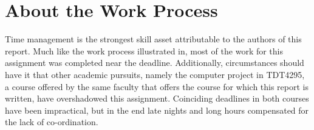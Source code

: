 \section{About the Work Process}

Time management is the strongest skill asset attributable to the authors of this report.
Much like the work process illustrated in\cite{assignment-1}, most of the work for this assignment was completed near the deadline.
Additionally, circumstances should have it that other academic pursuits, namely the computer project in TDT4295, a course offered by the same faculty that offers the course for which this report is written, have overshadowed this assignment.
Coinciding deadlines in both courses have been impractical, but in the end late nights and long hours compensated for the lack of co-ordination.
